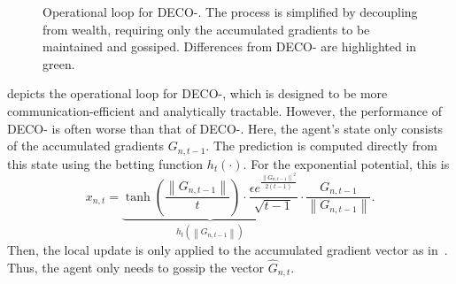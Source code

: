 \documentclass[journal]{IEEEtran} %
\newcommand{\br}[1]{\left(#1\right)}
\newcommand{\norm}[1]{\left\lVert{#1}\right\rVert}
\newcommand{\algname}{{DECO}\xspace}
\begin{document}
\begin{figure}[tbp!]
    \centering
    \caption{Operational loop for \algname{}-.
        The process is simplified by decoupling from wealth, requiring only the accumulated gradients to be maintained and gossiped.
        Differences from \algname{}- are highlighted in green.}\label{fig:flow-ii}
\end{figure}

 depicts the operational loop for \algname{}-, which is designed to be more communication-efficient and analytically tractable.
However, the performance of \algname{}- is often worse than that of \algname{}-.
Here, the agent's state only consists of the accumulated gradients $G_{n,t-1}$.
The prediction is computed directly from this state using the betting function $h_t(\cdot)$.
For the exponential potential, this is
\begin{equation}
    x_{n,t} = \underbrace{\tanh\br{\frac{\norm{G_{n,t-1}}}{t}} \cdot \frac{\epsilon e^{\frac{\norm{G_{n,t-1}}^2}{2(t-1)}}}{\sqrt{t-1}}}_{h_t(\norm{G_{n,t-1}})} \cdot \frac{G_{n,t-1}}{\norm{G_{n,t-1}}}.\label{eq:deco2_bet_vec}
\end{equation}
Then, the local update is only applied to the accumulated gradient vector as in~.
Thus, the agent only needs to gossip the vector $\hat{G}_{n,t}$.
\end{document}
